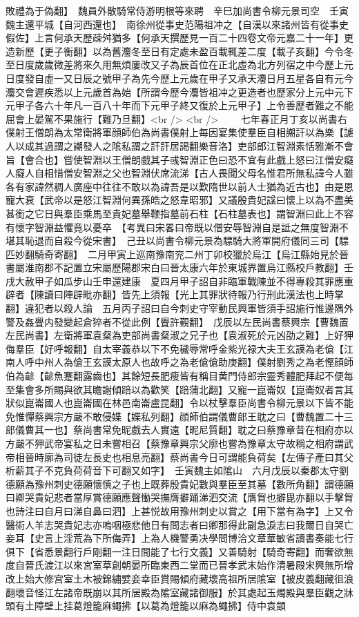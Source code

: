 敗禮為于偽翻】　魏員外散騎常侍游明根等來聘　辛巳加尚書令柳元景司空　壬寅魏主還平城【自河西還也】　南徐州從事史范陽祖冲之【自漢以來諸州皆有從事史假佐】上言何承天歷疎舛猶多【何承天撰歷見一百二十四卷文帝元嘉二十一年】更造新歷【更子衡翻】以為舊灋冬至日有定處未盈百載輒差二度【載子亥翻】今令冬至日度歲歲微差將來久用無煩屢改又子為辰首位在正北虛為北方列宿之中今歷上元日度發自虛一又日辰之號甲子為先今歷上元歲在甲子又承天灋日月五星各自有元今灋交會遲疾悉以上元歲首為始【所謂今歷今灋皆祖冲之更造者也歷家分上元中元下元甲子各六十年凡一百八十年而下元甲子終又復於上元甲子】上令善歷者難之不能屈會上晏駕不果施行【難乃旦翻】<br />
<br />
　　七年春正月丁亥以尚書右僕射王僧朗為太常衛將軍顔師伯為尚書僕射上每因宴集使羣臣自相謿訐以為樂【謔人以成其過謂之謿發人之隂私謂之訐訐居謁翻樂音洛】吏部郎江智淵素恬雅漸不會旨【會合也】嘗使智淵以王僧朗戲其子彧智淵正色曰恐不宜有此戲上怒曰江僧安癡人癡人自相惜僧安智淵之父也智淵伏席流涕【古人畏聞父母名惟君所無私諱今人雖各有家諱然稠人廣座中往往不敢以為諱吾是以歎隋世以前人士猶為近古也】由是恩寵大衰【武帝以是怒江智淵何異孫皓之怒韋昭邪】又議殷貴妃諡曰懷上以為不盡美甚銜之它日與羣臣乘馬至貴妃墓舉鞭指墓前石柱【石柱墓表也】謂智淵曰此上不容有懷字智淵益懼竟以憂卒　【考異曰宋畧曰帝既以僧安辱智淵自是詆之無度智淵不堪其恥退而自殺今從宋書】　己丑以尚書令柳元景為驃騎大將軍開府儀同三司【驃匹妙翻騎奇寄翻】　二月甲寅上巡南豫南兖二州丁卯校獵於烏江【烏江縣始見於晉書屬淮南郡不記置立宋屬歷陽郡宋白曰晉太康六年於東城界置烏江縣校戶教翻】壬戌大赦甲子如瓜步山壬申還建康　夏四月甲子詔自非臨軍戰陳並不得專殺其罪應重辟者【陳讀曰陣辟毗亦翻】皆先上須報【光上其罪狀待報乃行刑此漢法也上時掌翻】違犯者以殺人論　五月丙子詔曰自今刺史守宰動民興軍皆須手詔施行惟邊隅外警及姦舋内發變起倉猝者不從此例【舋許覲翻】　戊辰以左民尚書蔡興宗【曹魏置左民尚書】左衛將軍袁粲為吏部尚書粲淑之兄子也【袁淑死於元凶劭之難】上好狎侮羣臣【好呼報翻】自太宰義恭以下不免穢辱常呼金紫光禄大夫王玄謨為老傖【江南人呼中州人為傖王玄謨太原人也故呼之為老傖傖助庚翻】僕射劉秀之為老慳顔師伯為齴【齴魚蹇翻露齒也】其餘短長肥瘦皆有稱目黄門侍郎宗靈秀體肥拜起不便每至集會多所賜與欲其瞻謝傾踣以為歡笑【踣蒲北翻】又寵一崑崙奴【崑崙奴者言其狀似崑崙國人也崑崙國在林邑南崙盧昆翻】令以杖擊羣臣尚書令柳元景以下皆不能免惟憚蔡興宗方嚴不敢侵媟【媟私列翻】顔師伯謂儀曹郎王耽之曰【曹魏置二十三郎儀曹其一也】蔡尚書常免昵戲去人實遠【昵尼質翻】耽之曰蔡豫章昔在相府亦以方嚴不狎武帝宴私之日未嘗相召【蔡豫章興宗父廓也嘗為豫章太守故稱之相府謂武帝相晉時廓為司徒左長史也相息亮翻】蔡尚書今日可謂能負荷矣【左傳子產曰其父析薪其子不克負荷荷音下可翻又如字】　壬寅魏主如隂山　六月戊辰以秦郡太守劉德願為豫州刺史德願懷慎之子也上既葬殷貴妃數與羣臣至其墓【數所角翻】謂德願曰卿哭貴妃悲者當厚賞德願應聲慟哭撫膺擗踊涕泗交流【膺胷也擗毘亦翻以手擊胷也詩注曰自月曰涕自鼻曰泗】上甚悦故用豫州刺史以賞之【用下當有為字】上又令醫術人羊志哭貴妃志亦嗚咽極悲他日有問志者曰卿那得此副急淚志曰我爾日自哭亡妾耳【史言上淫荒為下所侮弄】上為人機警勇决學問博洽文章華敏省讀書奏能七行俱下【省悉景翻行戶剛翻一注日間能了七行文義】又善騎射【騎奇寄翻】而奢欲無度自晉氏渡江以來宮室草創朝晏所臨東西二堂而已晉孝武末始作清暑殿宋興無所增改上始大修宫室土木被錦繡嬖妾幸臣賞賜傾府藏壞高祖所居隂室【被皮義翻藏徂浪翻壞音怪江左諸帝既崩以其所居殿為隂室藏諸御服】於其處起玉燭殿與羣臣觀之牀頭有土障壁上挂葛燈籠麻蠅拂【以葛為燈籠以麻為蠅拂】侍中袁顗